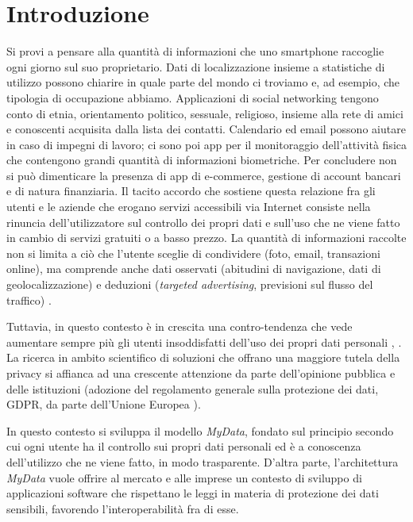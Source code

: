 \chapter{Introduzione}
\label{Introduzione}
\thispagestyle{empty}

\noindent Si provi a pensare alla quantit\`a di informazioni che uno smartphone raccoglie ogni giorno sul suo proprietario. Dati di localizzazione insieme a statistiche di utilizzo possono chiarire in quale parte del mondo ci troviamo e, ad esempio, che tipologia di occupazione abbiamo. Applicazioni di social networking tengono conto di etnia, orientamento politico, sessuale, religioso, insieme alla rete di amici e conoscenti acquisita dalla lista dei contatti. Calendario ed email possono aiutare in caso di impegni di lavoro; ci sono poi app per il monitoraggio dell’attivit\`a fisica che contengono grandi quantit\`a di informazioni biometriche. Per concludere non si pu\`o dimenticare la presenza di app di e-commerce, gestione di account bancari e di natura finanziaria. Il tacito accordo che sostiene questa relazione fra gli utenti e le aziende che erogano servizi accessibili via Internet consiste nella rinuncia dell’utilizzatore sul controllo dei propri dati e sull’uso che ne viene fatto in cambio di servizi gratuiti o a basso prezzo. La quantit\`a di informazioni raccolte non si limita a ci\`o che l’utente sceglie di condividere (foto, email, transazioni online), ma comprende anche dati osservati (abitudini di navigazione, dati di geolocalizzazione) e deduzioni (\textit{targeted advertising}, previsioni sul flusso del traffico) \cite{IAFmDavis}.

Tuttavia, in questo contesto \`e in crescita una contro-tendenza che vede aumentare sempre pi\`u gli utenti insoddisfatti dell’uso dei propri dati personali \cite{orangeDigitalTrust}, \cite{wefreport}. La ricerca in ambito scientifico di soluzioni che offrano una maggiore tutela della privacy si affianca ad una crescente attenzione da parte dell’opinione pubblica e delle istituzioni (adozione del regolamento generale sulla protezione dei dati, GDPR, da parte dell’Unione Europea \cite{gdpr}).

In questo contesto si sviluppa il modello \textit{MyData}, fondato sul principio secondo cui ogni utente ha il controllo sui propri dati personali ed \`e a conoscenza dell’utilizzo che ne viene fatto, in modo trasparente. D’altra parte, l’architettura \textit{MyData} vuole offrire al mercato e alle imprese un contesto di sviluppo di applicazioni software che rispettano le leggi in materia di protezione dei dati sensibili, favorendo l’interoperabilit\`a fra di esse.

